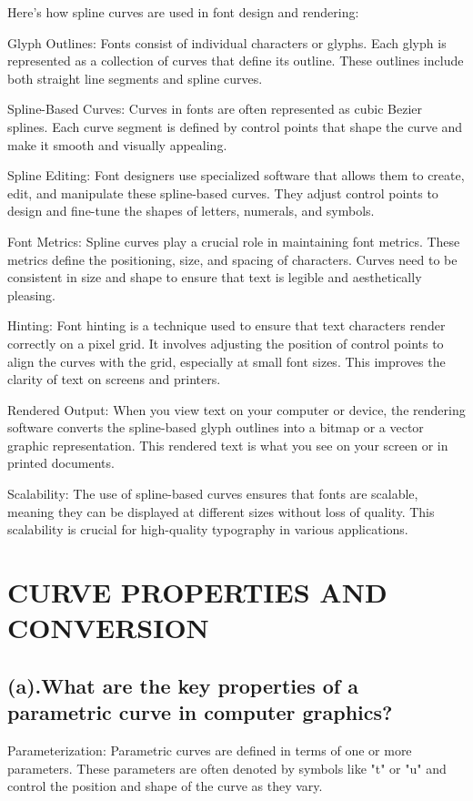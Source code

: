 \documentclass{article}
\begin{document}
\begin{itemize}
Here's how spline curves are used in font design and rendering:

Glyph Outlines: Fonts consist of individual characters or glyphs. Each glyph is represented as a collection of curves that define its outline. These outlines include both straight line segments and spline curves.

Spline-Based Curves: Curves in fonts are often represented as cubic Bezier splines. Each curve segment is defined by control points that shape the curve and make it smooth and visually appealing.

Spline Editing: Font designers use specialized software that allows them to create, edit, and manipulate these spline-based curves. They adjust control points to design and fine-tune the shapes of letters, numerals, and symbols.

Font Metrics: Spline curves play a crucial role in maintaining font metrics. These metrics define the positioning, size, and spacing of characters. Curves need to be consistent in size and shape to ensure that text is legible and aesthetically pleasing.

Hinting: Font hinting is a technique used to ensure that text characters render correctly on a pixel grid. It involves adjusting the position of control points to align the curves with the grid, especially at small font sizes. This improves the clarity of text on screens and printers.

Rendered Output: When you view text on your computer or device, the rendering software converts the spline-based glyph outlines into a bitmap or a vector graphic representation. This rendered text is what you see on your screen or in printed documents.

Scalability: The use of spline-based curves ensures that fonts are scalable, meaning they can be displayed at different sizes without loss of quality. This scalability is crucial for high-quality typography in various applications.
\section{CURVE PROPERTIES AND CONVERSION}
\subsection{(a).What are the key properties of a parametric curve in computer graphics?}
 Parameterization: Parametric curves are defined in terms of one or more parameters. These parameters are often denoted by symbols like "t" or "u" and control the position and shape of the curve as they vary.


\end{itemize}
\end{document}
